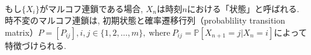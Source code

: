 \documentclass[a4j]{jsarticle}
\begin{document}
\\

もし$\{X_i\}$がマルコフ連鎖である場合, $X_n$は時刻$n$における「状態」と呼ばれる. 時不変のマルコフ連鎖は, 初期状態と確率遷移行列（probablility transition matrix）$P = [P_{ij}], i,j \in \{1, 2, \ldots, m\}, \: \mbox{where} \: P_{ij} = \mathbb{P}[X_{n+1} = j | X_n = i]$によって特徴づけられる.\\
\end{document}
